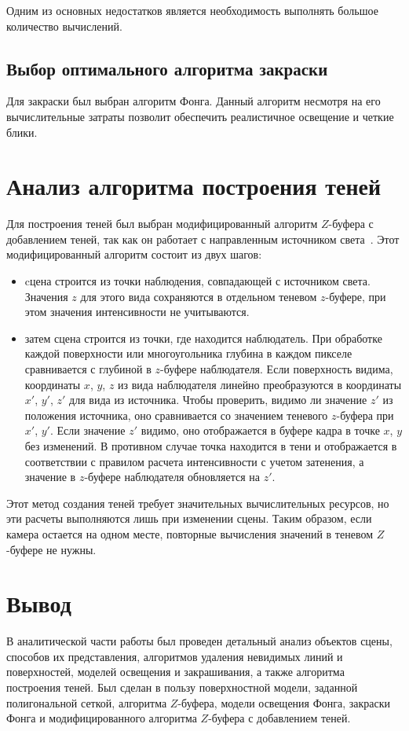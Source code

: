 Одним из основных недостатков является необходимость выполнять большое количество вычислений.

\subsection{Выбор оптимального алгоритма закраски}

Для закраски был выбран алгоритм Фонга. Данный алгоритм несмотря на его вычислительные затраты позволит обеспечить реалистичное освещение и четкие блики.

\section{Анализ алгоритма построения теней}

Для построения теней был выбран модифицированный алгоритм $Z$-буфера с добавлением теней, так как он работает с направленным источником света~\cite{lit3, lit8}. Этот модифицированный алгоритм состоит из двух шагов:
\begin{itemize}[label=--]
	\item cцена строится из точки наблюдения, совпадающей с источником света. Значения $z$ для этого вида сохраняются в отдельном теневом $z$-буфере, при этом значения интенсивности не учитываются.
	\item затем сцена строится из точки, где находится наблюдатель. При обработке каждой поверхности или многоугольника глубина в каждом пикселе сравнивается с глубиной в $z$-буфере наблюдателя. Если поверхность видима, координаты $x$, $y$, $z$ из вида наблюдателя линейно преобразуются в координаты $x'$, $y'$, $z'$ для вида из источника. Чтобы проверить, видимо ли значение $z'$ из положения источника, оно сравнивается со значением теневого $z$-буфера при $x'$, $y'$. Если значение $z'$ видимо, оно отображается в буфере кадра в точке $x$, $y$ без изменений. В противном случае точка находится в тени и отображается в соответствии с правилом расчета интенсивности с учетом затенения, а значение в $z$-буфере наблюдателя обновляется на $z'$.
\end{itemize}

Этот метод создания теней требует значительных вычислительных ресурсов, но эти расчеты выполняются лишь при изменении сцены. Таким образом, если камера остается на одном месте, повторные вычисления значений в теневом $Z$-буфере не нужны.

\section{Вывод}

В аналитической части работы был проведен детальный анализ объектов сцены, способов их представления, алгоритмов удаления невидимых линий и поверхностей, моделей освещения и закрашивания, а также алгоритма построения теней. Был сделан в пользу поверхностной модели, заданной полигональной сеткой, алгоритма $Z$-буфера, модели освещения Фонга, закраски Фонга и модифицированного алгоритма $Z$-буфера с добавлением теней.

\clearpage
